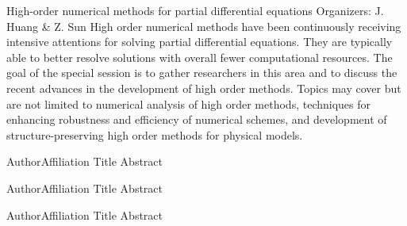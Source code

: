 \label{mini10}

\miniabs
{High-order numerical methods for partial differential equations}
{Organizers: J. Huang \& Z. Sun}
{High order numerical methods have been continuously receiving intensive attentions for solving partial differential equations. They are typically able to better resolve solutions with overall fewer computational resources. The goal of the special session is to gather researchers in this area and to discuss the recent advances in the development of high order methods. Topics may cover but are not limited to numerical analysis of high order methods, techniques for enhancing robustness and efficiency of numerical schemes, and development of structure-preserving high order methods for physical models.}
\vspace{2ex}



\abs
{Author}{Affiliation}
{Title}
{Abstract
}

\vspace{1.5ex}

\abs
{Author}{Affiliation}
{Title}
{Abstract
}

\vspace{1.5ex}

\abs
{Author}{Affiliation}
{Title}
{Abstract
}
